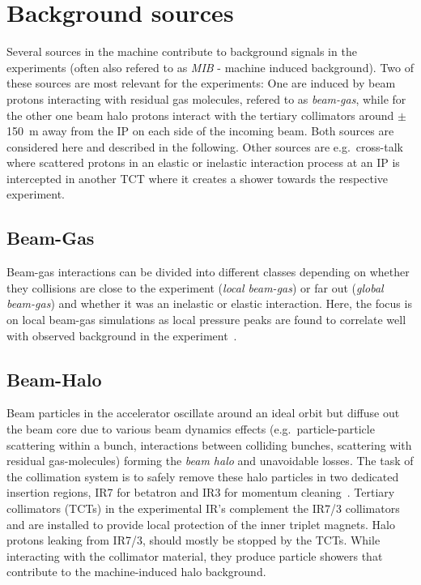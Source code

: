 \section{Background sources}
Several sources in the machine contribute to background signals in the experiments (often also refered to as \textit{MIB} - machine induced background). Two of these sources are most relevant for the experiments: One are induced by beam protons interacting with residual gas molecules, refered to as \textit{beam-gas}, while for the other one beam halo protons interact with the tertiary collimators around $\pm$150~m away from the IP on each side of the incoming beam. Both sources are considered here and described in the following. Other sources are e.g.~cross-talk where scattered protons in an elastic or inelastic interaction process at an IP is intercepted in another TCT where it creates a shower towards the respective experiment. 

\subsection{Beam-Gas}

Beam-gas interactions can be divided into different classes depending on whether they collisions are close to the experiment (\textit{local beam-gas}) or far out (\textit{global beam-gas}) and whether it was an inelastic or elastic interaction. Here, the focus is on local beam-gas simulations as local pressure peaks are found to correlate well with observed background in the experiment~\cite{nimPaperRod}.

\subsection{Beam-Halo}
Beam particles in the accelerator oscillate around an ideal orbit but diffuse out the beam core due to various beam dynamics effects (e.g.~particle-particle scattering within a bunch, interactions between colliding bunches, scattering with residual gas-molecules) forming the \textit{beam halo} and unavoidable losses. The task of the collimation system is to safely remove these halo particles in two dedicated insertion regions, IR7 for betatron and IR3 for momentum cleaning~\cite{LHCDesignRep,collRef}. Tertiary collimators (TCTs) in the experimental IR's complement the IR7/3 collimators and are installed to provide local protection of the inner triplet magnets. Halo protons leaking from IR7/3, should mostly be stopped by the TCTs. While interacting with the collimator material, they produce particle showers that contribute to the machine-induced halo background. 

